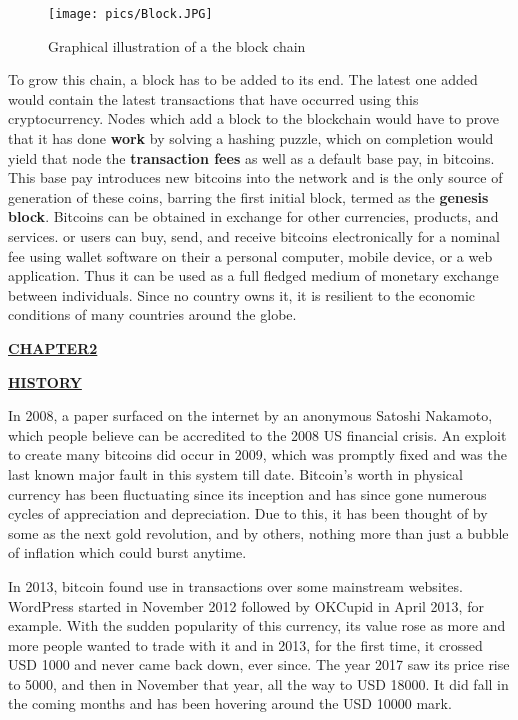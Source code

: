 \documentclass[12pt,a4paper]{report}
\begin{document}
\begin{flushleft}
\begin{figure}[h]
\centering
\caption{Graphical illustration of a the block chain}
\texttt{[image: pics/Block.JPG]}

\end{figure}

\vspace{10mm}

To grow this chain, a block has to be added to its end. The latest one added would contain the latest transactions that have occurred using this cryptocurrency. Nodes which add a block to the blockchain would have to prove that it has done \textbf{work} by solving a hashing puzzle, which on completion would yield that node the \textbf{transaction fees} as well as a default base pay, in bitcoins. This base pay introduces new bitcoins into the network and is the only source of generation of these coins, barring the first initial block, termed as the \textbf{genesis block}.
\vspace{10mm}
Bitcoins can be obtained in exchange for other currencies, products, and services. or users can buy, send, and receive bitcoins electronically for a nominal fee using wallet software on their a personal computer, mobile device, or a web application.
Thus it can be used as a full fledged medium of monetary exchange between individuals. Since no country owns it, it is resilient to the economic conditions of many countries around the globe.

\newpage
\begin{center}\underline{  \Large\textbf{CHAPTER2}}\end{center}
\begin{center}\underline{ \Large \textbf{HISTORY}}\end{center}


\vspace{10mm}
In 2008, a paper surfaced on the internet by an anonymous Satoshi Nakamoto, which people believe can be accredited to the 2008 US financial crisis. An exploit to create many bitcoins did occur in 2009, which was promptly fixed and was the last known major fault in this system till date. Bitcoin's worth in physical currency has been fluctuating since its inception and has since gone numerous cycles of appreciation and depreciation.
Due to this, it has been thought of by some as the next gold revolution, and by others, nothing more than just a bubble of inflation which could burst anytime.
\vspace{5mm}

In 2013, bitcoin found use in transactions over some mainstream websites. WordPress started in November 2012 followed by OKCupid in April 2013, for example.
With the sudden popularity of this currency, its value rose as more and more people wanted to trade with it and in 2013, for the first time, it crossed USD 1000 and never came back down, ever since. The year 2017 saw its price rise to 5000, and then in November that year, all the way to USD 18000. It did fall in the coming months and has been hovering around the USD 10000 mark.



\end{flushleft}
\end{document}
